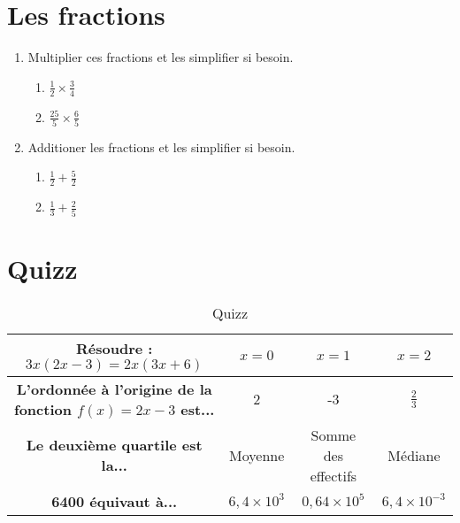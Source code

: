 \documentclass{article}
\begin{document}
\section{\textbf{Les fractions}} 
\begin{enumerate}
    \item Multiplier ces fractions et les simplifier si besoin.
    \begin{multicols}{2} 
        \begin{enumerate}
            \item \(\frac{1}{2} \times \frac{3}{4}\) \vspace{4cm}
            \item \(\frac{25}{5} \times \frac{6}{5}\) \vspace{4cm}
        \end{enumerate}
    \end{multicols}
    \vspace*{3cm}
    \item Additioner les fractions et les simplifier si besoin.
    \begin{multicols}{2} 
        \begin{enumerate}
            \item \(\frac{1}{2} + \frac{5}{2}\) \vspace{2cm}
            \item \(\frac{1}{3} + \frac{2}{5}\) \vspace{2cm}
        \end{enumerate}
    \end{multicols}
\end{enumerate}
\vspace{5cm}

\section{\textbf{Quizz}} 

\begin{table}[h!]
    \centering
    \renewcommand{\arraystretch}{3}
    \begin{tabular}{|c|c|c|c|} %
        \hline
        \textbf{Résoudre : \(3x(2x - 3) = 2x(3x+6)\)} & \( x = 0 \) & \( x = 1 \) & \( x = 2 \) \\ \hline
        \textbf{L'ordonnée à l'origine de la fonction \( f(x) = 2x-3 \) est... }   & 2  & -3  & \(\frac{2}{3}\)  \\ \hline
        \textbf{Le deuxième quartile est la...} & Moyenne & Somme des effectifs & Médiane \\ \hline
        \textbf{6400 équivaut à...} & \( 6,4 \times 10^3\) & \( 0,64 \times 10^5\) & \(6,4 \times 10^{-3}\) \\ \hline
    \end{tabular}
\caption{Quizz}
\end{table}
\end{document}
